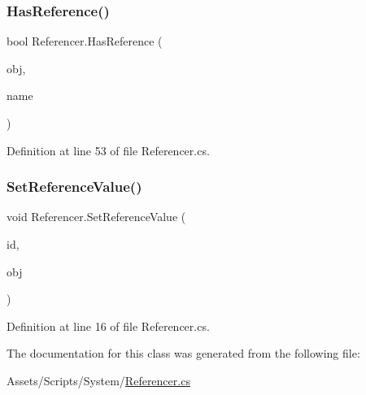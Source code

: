 \subsubsection{\texorpdfstring{Has\+Reference()}{HasReference()}}
{\footnotesize\ttfamily bool Referencer.\+Has\+Reference (\begin{DoxyParamCaption}\item[{\mbox{\hyperlink{_quads_8cs_aef19bab18b9814edeef255c43e4f6bbc}{Object}}}]{obj,  }\item[{out Property\+Name}]{name }\end{DoxyParamCaption})}



Definition at line 53 of file Referencer.\+cs.

\mbox{\label{class_referencer_a162fa767f7bd9e01f760ed2ee7c5b8a7}} 
\subsubsection{\texorpdfstring{Set\+Reference\+Value()}{SetReferenceValue()}}
{\footnotesize\ttfamily void Referencer.\+Set\+Reference\+Value (\begin{DoxyParamCaption}\item[{Property\+Name}]{id,  }\item[{\mbox{\hyperlink{_quads_8cs_aef19bab18b9814edeef255c43e4f6bbc}{Object}}}]{obj }\end{DoxyParamCaption})}



Definition at line 16 of file Referencer.\+cs.



The documentation for this class was generated from the following file\+:\begin{DoxyCompactItemize}
\item 
Assets/\+Scripts/\+System/\mbox{\hyperlink{_referencer_8cs}{Referencer.\+cs}}\end{DoxyCompactItemize}
